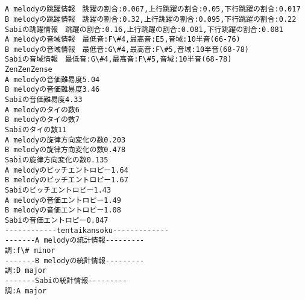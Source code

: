 \documentclass[11pt]{article}
\begin{document}
    \begin{center}
    \end{center}
    { \hspace*{\fill} \\}
    
    \begin{center}
    \end{center}
    { \hspace*{\fill} \\}
    
    \begin{Verbatim}[commandchars=\\\{\}]
A melodyの跳躍情報　跳躍の割合:0.067,上行跳躍の割合:0.05,下行跳躍の割合:0.017
B melodyの跳躍情報　跳躍の割合:0.32,上行跳躍の割合:0.095,下行跳躍の割合:0.22
Sabiの跳躍情報　跳躍の割合:0.16,上行跳躍の割合:0.081,下行跳躍の割合:0.081
A melodyの音域情報　最低音:F\#4,最高音:E5,音域:10半音(66-76)
B melodyの音域情報　最低音:G\#4,最高音:F\#5,音域:10半音(68-78)
Sabiの音域情報　最低音:G\#4,最高音:F\#5,音域:10半音(68-78)
ZenZenZense
A melodyの音価難易度5.04
B melodyの音価難易度3.46
Sabiの音価難易度4.33
A melodyのタイの数6
B melodyのタイの数7
Sabiのタイの数11
A melodyの旋律方向変化の数0.203
B melodyの旋律方向変化の数0.478
Sabiの旋律方向変化の数0.135
A melodyのピッチエントロピー1.64
B melodyのピッチエントロピー1.67
Sabiのピッチエントロピー1.43
A melodyの音価エントロピー1.49
B melodyの音価エントロピー1.08
Sabiの音価エントロピー0.847
------------tentaikansoku-------------
-------A melodyの統計情報---------
調:f\# minor
-------B melodyの統計情報---------
調:D major
-------Sabiの統計情報---------
調:A major

    \end{Verbatim}

    \begin{center}
    \end{center}
    { \hspace*{\fill} \\}
    
    \begin{center}
    \end{center}
    { \hspace*{\fill} \\}
    
\end{document}
